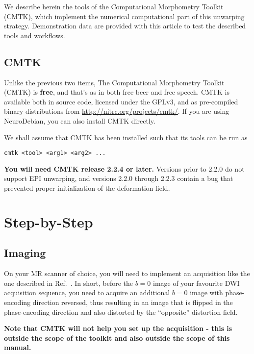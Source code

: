 \documentclass{InsightArticle}
\begin{document}
We describe herein the tools of the Computational Morphometry Toolkit (CMTK),
which implement the numerical computational part of this unwarping
strategy. Demonstration data are provided with this article to test the
described tools and workflows.

\subsection{CMTK}

Unlike the previous two items, The Computational Morphometry Toolkit (CMTK) is
{\bf free}, and that's as in both free beer and free speech. CMTK is available
both in source code, licensed under the GPLv3, and as pre-compiled binary
distributions from \url{http://nitrc.org/projects/cmtk/}. If you are using
NeuroDebian, you can also install CMTK directly.

We shall assume that CMTK has been installed such that its tools can be run as
\begin{verbatim}
cmtk <tool> <arg1> <arg2> ...
\end{verbatim}

{\bf You will need CMTK release 2.2.4 or later.} Versions prior to 2.2.0 do not
  support EPI unwarping, and versions 2.2.0 through 2.2.3 contain a bug that
  prevented proper initialization of the deformation field.

\section{Step-by-Step}

\subsection{Imaging}

On your MR scanner of choice, you will need to implement an acquisition like
the one described in Ref.~\cite{HollKupeDale:2010}. In short, before the $b=0$
image of your favourite DWI acquisition sequence, you need to acquire an
additional $b=0$ image with phase-encoding direction reversed, thus resulting
in an image that is flipped in the phase-encoding direction and also distorted
by the ``opposite'' distortion field. 

{\bf Note that CMTK will not help you set up the acquisition - this is outside
the scope of the toolkit and also outside the scope of this manual.}
\end{document}
